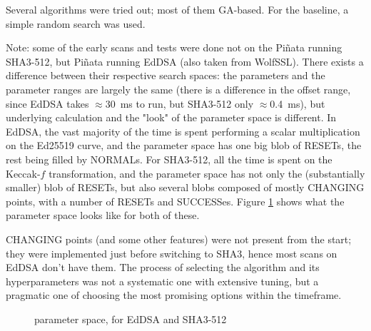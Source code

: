 \documentclass[times, utf8, diplomski]{fer}
\begin{document}
Several algorithms were tried out; most of them GA-based.
For the baseline, a simple random search was used.

Note: some of the early scans and tests were done not on the Piñata running
SHA3-512, but Piñata running EdDSA (also taken from WolfSSL). There exists a
difference between their respective search spaces: the parameters and the
parameter ranges are largely the same (there is a difference in the offset
range, since EdDSA takes $\approx$\SI{30}{\milli\second} to run, but SHA3-512
only $\approx$\SI{0.4}{\milli\second}), but underlying calculation and the
"look" of the parameter space is different. In EdDSA, the vast majority of
the time is spent performing a scalar multiplication on the Ed25519 curve,
and the parameter space has one big blob of RESETs, the rest being filled
by NORMALs. For SHA3-512, all the time is spent on the Keccak-$f$
transformation, and the parameter space has not only the (substantially smaller)
blob of RESETs, but also several blobs composed of mostly CHANGING points, with
a number of RESETs and SUCCESSes. Figure \ref{fig:parameter_spaces} shows what
the parameter space looks like for both of these.

CHANGING points (and some other features) were not present from the start;
they were implemented just before switching to SHA3, hence most scans on EdDSA
don't have them. The process of selecting the algorithm and its hyperparameters
was not a systematic one with extensive tuning, but a pragmatic one of choosing
the most promising options within the timeframe.

\begin{figure}[htbp]
    \centering
    \caption{parameter space, for EdDSA and SHA3-512}
    \label{fig:parameter_spaces}
\end{figure}
\end{document}
